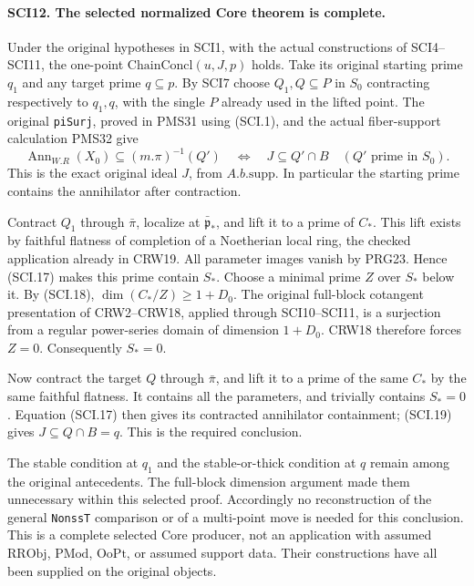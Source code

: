 \paragraph{SCI12. The selected normalized Core theorem is complete.}
\label{claim:SCI12}
Under the original hypotheses in SCI1, with the actual constructions
of SCI4--SCI11,
the one-point \(\mathrm{ChainConcl}(u,J,p)\) holds.
Take its original starting prime \(q_1\) and any target prime
\(q\subseteq p\). By SCI7 choose \(Q_1,Q\subseteq P\)
in \(S_0\) contracting respectively to \(q_1,q\), with
the single \(P\) already used in the lifted point.
The original \texttt{piSurj}, proved in PMS31 using (SCI.1),
and the actual fiber-support calculation PMS32 give
\[
 \operatorname{Ann}_{W.R}(X_0)\subseteq(m.\pi)^{-1}(Q')
       \quad\Longleftrightarrow\quad J\subseteq Q'\cap B
       \quad(Q'\text{ prime in }S_0).                    \tag{SCI.19}
\]
This is the exact original ideal \(J\), from
\(A.b.\mathrm{supp}\). In particular the starting prime
contains the annihilator after contraction.

Contract \(Q_1\) through \(\bar\pi\), localize at
\(\bar{\mathfrak p}_*\), and lift it to a prime of \(C_*\).
This lift exists by faithful flatness of completion of a
Noetherian local ring, the checked application already in CRW19.
All parameter images vanish by PRG23. Hence (SCI.17) makes
this prime contain \(S_*\). Choose a minimal prime \(Z\)
over \(S_*\) below it. By (SCI.18),
\(\dim(C_*/Z)\ge1+D_0\). The original full-block cotangent
presentation of CRW2--CRW18, applied through SCI10--SCI11,
is a surjection from a regular power-series domain of dimension
\(1+D_0\). CRW18 therefore forces \(Z=0\).
Consequently \(S_*=0\).

Now contract the target \(Q\) through \(\bar\pi\), and
lift it to a prime of the same \(C_*\) by the same faithful
flatness. It contains all the parameters, and trivially contains
\(S_*=0\). Equation (SCI.17) then gives its contracted
annihilator containment; (SCI.19) gives
\(J\subseteq Q\cap B=q\). This is the required conclusion.

The stable condition at \(q_1\) and the stable-or-thick
condition at \(q\) remain among the original antecedents.
The full-block dimension argument made them unnecessary within
this selected proof. Accordingly no reconstruction of the
general \texttt{NonssT} comparison or of a multi-point move
is needed for this conclusion. This is a complete selected
\(\mathrm{Core}\) producer, not an application with assumed
\(\mathrm{RRObj}\), \(\mathrm{PMod}\), \(\mathrm{OoPt}\),
or assumed support data. Their constructions have all been
supplied on the original objects.


